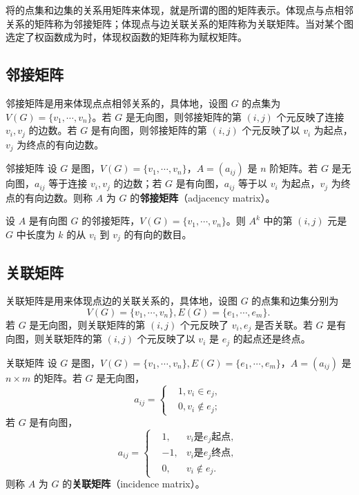 
将的点集和边集的关系用矩阵来体现，就是所谓的图的矩阵表示。体现点与点相邻关系的矩阵称为邻接矩阵；体现点与边关联关系的矩阵称为关联矩阵。当对某个图选定了权函数成为时，体现权函数的矩阵称为赋权矩阵。

\subsection{邻接矩阵}
邻接矩阵是用来体现点点相邻关系的，具体地，设图 $G$ 的点集为 $V(G)=\{v_1,\cdots,v_n\}$。若 $G$ 是无向图，则邻接矩阵的第 $(i,j)$ 个元反映了连接 $v_i,v_j$ 的边数。若 $G$ 是有向图，则邻接矩阵的第 $(i,j)$ 个元反映了以 $v_i$ 为起点，$v_j$ 为终点的有向边数。
\begin{definition}{邻接矩阵}
设 $G$ 是图，$V(G)=\{v_1,\cdots,v_n\}$，$A=(a_{ij})$ 是 $n$ 阶矩阵。若 $G$ 是无向图，$a_{ij}$ 等于连接 $v_i,v_j$ 的边数；若 $G$ 是有向图，$a_{ij}$ 等于以 $v_i$ 为起点，$v_j$ 为终点的有向边数。则称 $A$ 为 $G$ 的\textbf{邻接矩阵}（adjacency matrix）。
\end{definition}

\begin{theorem}{}
设 $A$ 是有向图 $G$ 的邻接矩阵，$V(G)=\{v_1,\cdots,v_n\}$。则 $A^k$ 中的第 $(i,j)$ 元是 $G$ 中长度为 $k$ 的从 $v_i$ 到 $v_j$ 的有向的数目。
\end{theorem}

\subsection{关联矩阵}

关联矩阵是用来体现点边的关联关系的，具体地，设图 $G$ 的点集和边集分别为 
\begin{equation}
V(G)=\{v_1,\cdots,v_n\},E(G)=\{e_1,\cdots,e_m\}.~
\end{equation}
若 $G$ 是无向图，则关联矩阵的第 $(i,j)$ 个元反映了 $v_i,e_j$ 是否关联。若 $G$ 是有向图，则关联矩阵的第 $(i,j)$ 个元反映了以 $v_i$ 是 $e_j$ 的起点还是终点。
\begin{definition}{关联矩阵}
设 $G$ 是图，$V(G)=\{v_1,\cdots,v_n\},E(G)=\{e_1,\cdots,e_m\}$，$A=(a_{ij})$ 是 $n\times m$ 的矩阵。若 $G$ 是无向图，
\begin{equation}
a_{ij}=\left\{\begin{aligned}
&1, v_i\in e_j,\\
&0, v_i\not\in e_j;
\end{aligned}\right.~
\end{equation}
若 $G$ 是有向图，
\begin{equation}
a_{ij}=\left\{\begin{aligned}
&1, &v_i\text{是} e_j\text{起点} ,\\
&-1, &v_i\text{是} e_j\text{终点} ,\\
&0,&v_i\not\in e_j.
\end{aligned}\right.~
\end{equation}
则称 $A$ 为 $G$ 的\textbf{关联矩阵}（incidence matrix）。
\end{definition}


